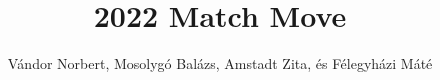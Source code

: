 \documentclass[sigplan,11pt,nonacm=true]{acmart}
\begin{document}
\title{2022 Match Move}


\author{Vándor Norbert, Mosolygó Balázs, Amstadt Zita, és Félegyházi Máté}


\maketitle






\end{document}

